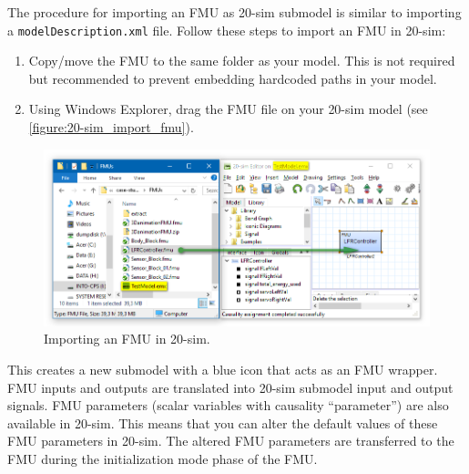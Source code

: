The procedure for importing an FMU as {20-sim} submodel is similar to importing a \texttt{modelDescription\allowbreak{}.xml} file.
Follow these steps to import an FMU in {20-sim}:
%
%
%
\begin{enumerate}
  \item Copy/move the FMU to the same folder as your model. This is not required but recommended to prevent embedding hardcoded paths in your model.
  \item Using Windows Explorer, drag the FMU file on your {20-sim} model (see \autoref{figure:20-sim_import_fmu}). 
\end{enumerate}
%
%
%
\begin{figure}[ht]
	\centerline{\includegraphics[width=\textwidth]{figures/20-sim_import_fmu.png}}
	\caption{Importing an FMU in 20-sim.}
	\label{figure:20-sim_import_fmu}
\end{figure}
%
%
%
This creates a new submodel with a blue icon that acts as an FMU wrapper. FMU inputs and outputs are translated into {20-sim} submodel input and output signals.
FMU parameters (scalar variables with causality ``parameter'') are also available in {20-sim}.
This means that you can alter the default values of these FMU parameters in {20-sim}.
The altered FMU parameters are transferred to the FMU during the initialization mode phase of the FMU.
